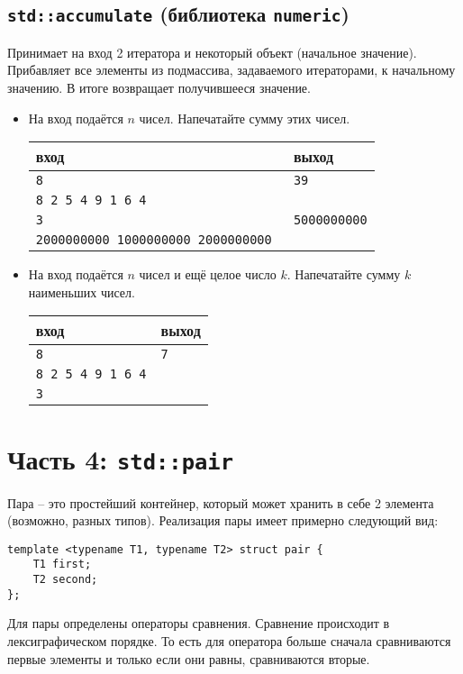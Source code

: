 \documentclass{article}
\begin{document}
\subsection*{\texttt{std::accumulate} (библиотека \texttt{numeric})}
Принимает на вход 2 итератора и некоторый объект (начальное значение). Прибавляет все элементы из подмассива, задаваемого итераторами, к начальному значению. В итоге возвращает получившееся значение.
\begin{itemize}
\item На вход подаётся $n$ чисел. Напечатайте сумму этих чисел.
\begin{center}
\begin{tabular}{ l | l }
 вход & выход \\ \hline
 \texttt{8} & \texttt{39}  \\ 
 \texttt{8 2 5 4 9 1 6 4} &  \\ \hline
 \texttt{3} & \texttt{5000000000}  \\ 
 \texttt{2000000000 1000000000 2000000000 } &  \\
\end{tabular}
\end{center}

\item На вход подаётся $n$ чисел и ещё целое число $k$. Напечатайте сумму $k$ наименьших чисел.
\begin{center}
\begin{tabular}{ l | l }
 вход & выход \\ \hline
 \texttt{8} & \texttt{7}  \\ 
 \texttt{8 2 5 4 9 1 6 4} &  \\
 \texttt{3} &\\
\end{tabular}
\end{center}
\end{itemize}

\newpage
\section*{Часть 4: \texttt{std::pair}}
Пара -- это простейший контейнер, который может хранить в себе 2 элемента (возможно, разных типов). Реализация пары имеет примерно следующий вид:
\begin{lstlisting}
template <typename T1, typename T2> struct pair {
    T1 first;
    T2 second;
};
\end{lstlisting}
Для пары определены операторы сравнения. Сравнение происходит в лексиграфическом порядке. То есть для оператора больше сначала сравниваются первые элементы и только если они равны, сравниваются вторые.\\
\end{document}
